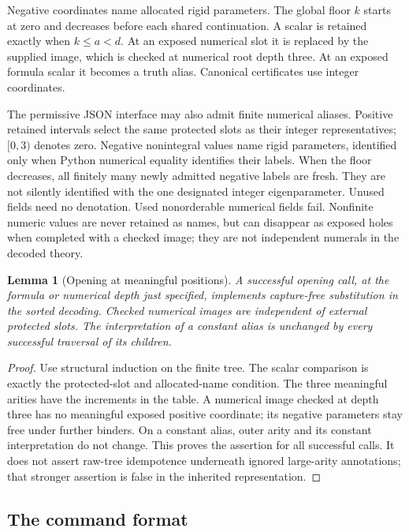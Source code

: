 \documentclass[11pt,letterpaper]{article}
\newtheorem{lemma}[theorem]{Lemma}
\theoremstyle{definition}\newtheorem{definition}[theorem]{Definition}
\theoremstyle{remark}\newtheorem{remark}[theorem]{Remark}
\begin{document}
Negative coordinates name allocated rigid parameters. The global floor
$k$ starts at zero and decreases before each shared continuation. A
scalar is retained exactly when $k\le a<d$. At an exposed numerical
slot it is replaced by the supplied image, which is checked at numerical
root depth three. At an exposed formula scalar it becomes a truth alias.
Canonical certificates use integer coordinates.

The permissive JSON interface may also admit finite numerical aliases.
Positive retained intervals select the same protected slots as their
integer representatives; $[0,3)$ denotes zero. Negative nonintegral
values name rigid parameters, identified only when Python numerical
equality identifies their labels. When the floor decreases, all finitely
many newly admitted negative labels are fresh. They are not silently
identified with the one designated integer eigenparameter. Unused fields
need no denotation. Used nonorderable numerical fields fail. Nonfinite
numeric values are never retained as names, but can disappear as exposed
holes when completed with a checked image; they are not independent
numerals in the decoded theory.

\begin{lemma}[Opening at meaningful positions]
A successful opening call, at the formula or numerical depth just
specified, implements capture-free substitution in the sorted decoding.
Checked numerical images are independent of external protected slots.
The interpretation of a constant alias is unchanged by every successful
traversal of its children.
\end{lemma}
\begin{proof}
Use structural induction on the finite tree. The scalar comparison is
exactly the protected-slot and allocated-name condition. The three
meaningful arities have the increments in the table. A numerical image
checked at depth three has no meaningful exposed positive coordinate;
its negative parameters stay free under further binders. On a constant
alias, outer arity and its constant interpretation do not change.
This proves the assertion for all successful calls. It does not assert
raw-tree idempotence underneath ignored large-arity annotations; that
stronger assertion is false in the inherited representation.
\end{proof}

\subsection{The command format}
\end{document}
